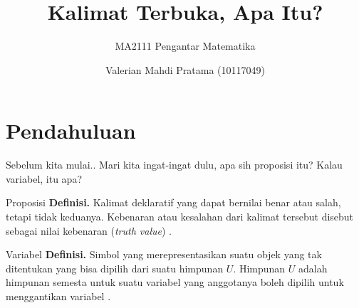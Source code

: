 \documentclass[11pt]{beamer}
\begin{document}
	\author{Valerian Mahdi Pratama (10117049)}
	\title{Kalimat Terbuka, Apa Itu?}
	\subtitle{MA2111 Pengantar Matematika}
	\date{}
\begin{frame}[plain]
\maketitle
\end{frame}
\section{Pendahuluan}
\begin{frame}{Sebelum kita mulai..}
Mari kita ingat-ingat dulu, apa sih proposisi itu? Kalau variabel, itu apa?
\begin{block}{Proposisi}
	\pause
	\textbf{Definisi.} Kalimat deklaratif yang dapat bernilai benar atau salah, tetapi tidak keduanya. Kebenaran atau kesalahan dari kalimat tersebut disebut sebagai nilai kebenaran (\textit{truth value}) \cite{RM14}.
\end{block}
\begin{block}{Variabel}
	\pause
	\textbf{Definisi.} Simbol yang merepresentasikan suatu objek yang tak ditentukan yang bisa dipilih dari suatu himpunan $U$. Himpunan $U$ adalah himpunan semesta untuk suatu variabel yang anggotanya boleh dipilih untuk menggantikan variabel \cite{TS18}.
\end{block}
\end{frame}
\end{document}
